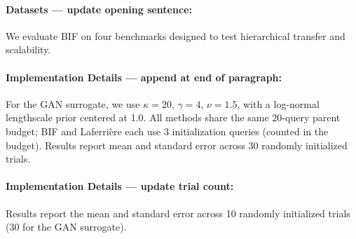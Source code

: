 \paragraph{Datasets --- update opening sentence:}

We evaluate BIF on four benchmarks designed to test hierarchical
transfer and scalability.



\paragraph{Implementation Details --- append at end of paragraph:}

For the GAN surrogate, we use $\kappa\!=\!20$, $\gamma\!=\!4$,
$\nu\!=\!1.5$, with a log-normal lengthscale prior centered at 1.0.
All methods share the same 20-query parent budget;
BIF and Laferri\`ere each use 3 initialization queries
(counted in the budget). Results report mean and standard error
across 30 randomly initialized trials.



\paragraph{Implementation Details --- update trial count:}

Results report the mean and standard error across 10 randomly
initialized trials (30 for the GAN surrogate).



